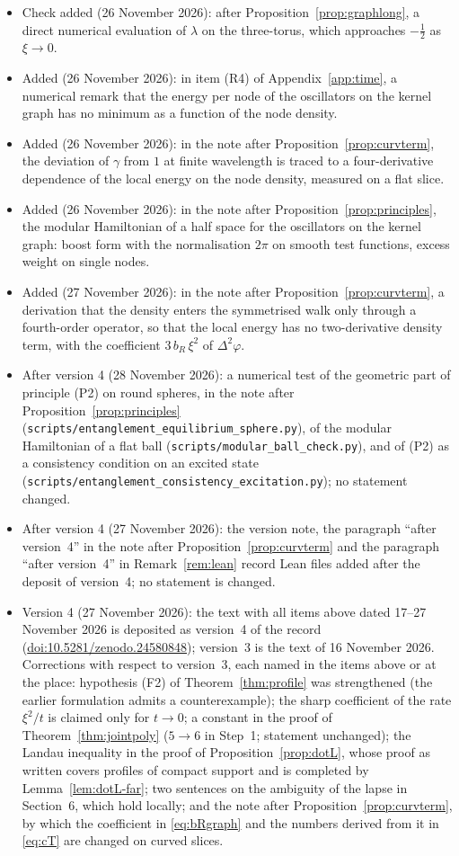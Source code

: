 \documentclass[11pt,a4paper]{article}
\theoremstyle{stmt}
\theoremstyle{defn}
\theoremstyle{rmk}
\numberwithin{equation}{section}
\begin{document}
\begin{itemize}
\item Check added (26 November 2026): after Proposition~\ref{prop:graphlong}, a direct numerical evaluation of $\lambda$ on the three-torus, which approaches $-\tfrac12$ as $\xi\to0$.
\item Added (26 November 2026): in item (R4) of Appendix~\ref{app:time}, a numerical remark that the energy per node of the oscillators on the kernel graph has no minimum as a function of the node density.
\item Added (26 November 2026): in the note after Proposition~\ref{prop:curvterm}, the deviation of $\gamma$ from $1$ at finite wavelength is traced to a four-derivative dependence of the local energy on the node density, measured on a flat slice.
\item Added (26 November 2026): in the note after Proposition~\ref{prop:principles}, the modular Hamiltonian of a half space for the oscillators on the kernel graph: boost form with the normalisation $2\pi$ on smooth test functions, excess weight on single nodes.
\item Added (27 November 2026): in the note after Proposition~\ref{prop:curvterm}, a derivation that the density enters the symmetrised walk only through a fourth-order operator, so that the local energy has no two-derivative density term, with the coefficient $3\,b_R\,\xi^2$ of $\Delta^2\varphi$.
\item After version 4 (28 November 2026): a numerical test of the geometric part of principle \textup{(P2)} on round spheres, in the note after Proposition~\ref{prop:principles} (\texttt{scripts/entanglement\_equilibrium\_sphere.py}), of the modular Hamiltonian of a flat ball (\texttt{scripts/modular\_ball\_check.py}), and of \textup{(P2)} as a consistency condition on an excited state (\texttt{scripts/entanglement\_consistency\_excitation.py}); no statement changed.
\item After version 4 (27 November 2026): the version note, the paragraph ``after version~4'' in the note after Proposition~\ref{prop:curvterm} and the paragraph ``after version~4'' in Remark~\ref{rem:lean} record Lean files added after the deposit of version~4; no statement is changed.
\item Version 4 (27 November 2026): the text with all items above dated 17--27 November 2026 is deposited as version~4 of the record (\href{https://doi.org/10.5281/zenodo.24580848}{doi:10.5281/zenodo.24580848}); version~3 is the text of 16 November 2026. Corrections with respect to version~3, each named in the items above or at the place: hypothesis (F2) of Theorem~\ref{thm:profile} was strengthened (the earlier formulation admits a counterexample); the sharp coefficient of the rate $\xi^2/t$ is claimed only for $t\to0$; a constant in the proof of Theorem~\ref{thm:jointpoly} ($5\to6$ in Step~1; statement unchanged); the Landau inequality in the proof of Proposition~\ref{prop:dotL}, whose proof as written covers profiles of compact support and is completed by Lemma~\ref{lem:dotL-far}; two sentences on the ambiguity of the lapse in Section~6, which hold locally; and the note after Proposition~\ref{prop:curvterm}, by which the coefficient in \eqref{eq:bRgraph} and the numbers derived from it in \eqref{eq:cT} are changed on curved slices.

\end{itemize}
\end{document}

